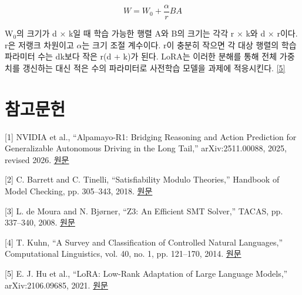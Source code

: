 \documentclass[11pt,a4paper]{article}
\begin{document}
\[W = W_0 + \frac{\alpha}{r}BA\]

W\ensuremath{{}_0}의 크기가 d × k일 때 학습 가능한 행렬 A와 B의 크기는 각각 r × k와 d × r이다. r은 저랭크 차원이고 \ensuremath{\alpha}는 크기 조절 계수이다. r이 충분히 작으면 각 대상 행렬의 학습 파라미터 수는 dk보다 작은 r(d + k)가 된다. LoRA는 이러한 분해를 통해 전체 가중치를 갱신하는 대신 적은 수의 파라미터로 사전학습 모델을 과제에 적응시킨다. \href{\detokenize{https://arxiv.org/abs/2106.09685}}{[5]}\par

\section*{참고문헌}

[1] NVIDIA et al., “Alpamayo-R1: Bridging Reasoning and Action Prediction for Generalizable Autonomous Driving in the Long Tail,” arXiv:2511.00088, 2025, revised 2026. \href{\detokenize{https://arxiv.org/abs/2511.00088}}{원문}\par

[2] C. Barrett and C. Tinelli, “Satisfiability Modulo Theories,” Handbook of Model Checking, pp. 305–343, 2018. \href{\detokenize{https://theory.stanford.edu/~barrett/pubs/BT18.pdf}}{원문}\par

[3] L. de Moura and N. Bjørner, “Z3: An Efficient SMT Solver,” TACAS, pp. 337–340, 2008. \href{\detokenize{https://doi.org/10.1007/978-3-540-78800-3_24}}{원문}\par

[4] T. Kuhn, “A Survey and Classification of Controlled Natural Languages,” Computational Linguistics, vol. 40, no. 1, pp. 121–170, 2014. \href{\detokenize{https://aclanthology.org/J14-1005/}}{원문}\par

[5] E. J. Hu et al., “LoRA: Low-Rank Adaptation of Large Language Models,” arXiv:2106.09685, 2021. \href{\detokenize{https://arxiv.org/abs/2106.09685}}{원문}\par
\end{document}
